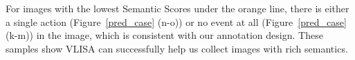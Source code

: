 For images with the lowest Semantic Scores under the orange line, there is either a single action (Figure~\ref{pred_case} (n-o)) or no event at all (Figure~\ref{pred_case} (k-m)) in the image, which is consistent with our annotation design.
These samples show VLISA can successfully help us collect images with rich semantics. 
